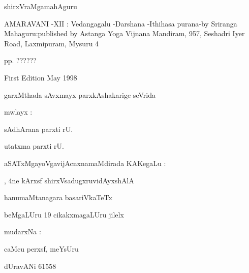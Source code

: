 \vskip 5cm

\begin{center}
{\large shirxVraMgamahAguru}
\end{center}

\newpage

\thispagestyle{empty}

\noindent
{\eng AMARAVANI -XII : Vedangagalu -Darshana -Ithihasa purana-by Sriranga Mahaguru:published by Astanga Yoga Vijnana Mandiram, 957, Seshadri Iyer Road, Laxmipuram, Mysuru 4}

\medskip
{\eng pp. ??????}%

\medskip
{\eng First Edition May 1998}

\medskip

garxMthada sAvxmayx parxkAshakarige seVrida

\vskip 2cm
\begin{center}
mwlayx :

sAdhArana parxti rU.

utatxma parxti rU.
\end{center}

\vskip 2cm

\begin{center}
aSATxMgayoVgavijAcnxnamaMdirada KAKegaLu :

, 4ne kArxsf \hspace{1cm}  shirxVsadugxruvidAyxshAlA

\medskip
hanumaMtanagara \hspace{2.5cm} basariVkaTeTx

\medskip
beMgaLUru 19 \hspace{1.3cm} cikakxmagaLUru jilelx
\end{center}

\vskip 2cm

\begin{center}
mudarxNa :

caMcu perxsf, meYsUru

dUravANi {\rm 61558}
\end{center}
